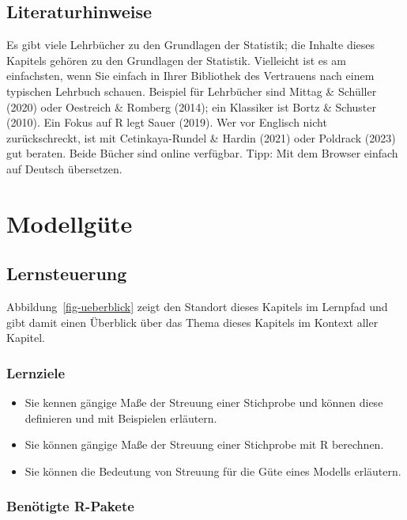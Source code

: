 \documentclass[
  letterpaper,
]{scrbook}
\providecommand{\tightlist}{%
  \setlength{\itemsep}{0pt}\setlength{\parskip}{0pt}}\usepackage{longtable,booktabs,array}
\theoremstyle{definition}
\theoremstyle{definition}
\theoremstyle{definition}
\theoremstyle{remark}
\begin{document}
\section{Literaturhinweise}\label{literaturhinweise-4}

Es gibt viele Lehrbücher zu den Grundlagen der Statistik; die Inhalte
dieses Kapitels gehören zu den Grundlagen der Statistik. Vielleicht ist
es am einfachsten, wenn Sie einfach in Ihrer Bibliothek des Vertrauens
nach einem typischen Lehrbuch schauen. Beispiel für Lehrbücher sind
Mittag \& Schüller (2020) oder Oestreich \& Romberg (2014); ein
Klassiker ist Bortz \& Schuster (2010). Ein Fokus auf R legt Sauer
(2019). Wer vor Englisch nicht zurückschreckt, ist mit Cetinkaya-Rundel
\& Hardin (2021) oder Poldrack (2023) gut beraten. Beide Bücher sind
online verfügbar. Tipp: Mit dem Browser einfach auf Deutsch übersetzen.

\chapter{Modellgüte}\label{modellguxfcte}

\section{Lernsteuerung}\label{lernsteuerung-5}

Abbildung~\ref{fig-ueberblick} zeigt den Standort dieses Kapitels im
Lernpfad und gibt damit einen Überblick über das Thema dieses Kapitels
im Kontext aller Kapitel.

\subsection{Lernziele}\label{lernziele-6}

\begin{itemize}
\tightlist
\item
  Sie kennen gängige Maße der Streuung einer Stichprobe und können diese
  definieren und mit Beispielen erläutern.
\item
  Sie können gängige Maße der Streuung einer Stichprobe mit R berechnen.
\item
  Sie können die Bedeutung von Streuung für die Güte eines Modells
  erläutern.
\end{itemize}

\subsection{Benötigte R-Pakete}\label{benuxf6tigte-r-pakete-3}
\end{document}
